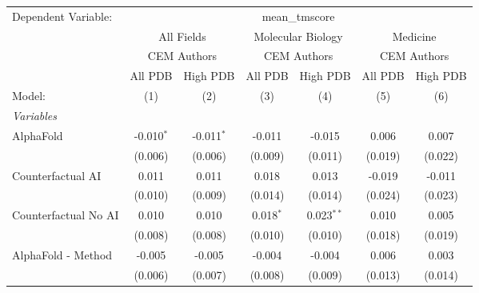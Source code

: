 \begingroup
\centering
\begin{tabular}{lcccccc}
   \tabularnewline \midrule \midrule
   Dependent Variable: & \multicolumn{6}{c}{mean\_tmscore}\\
 & \multicolumn{2}{c}{All Fields} & \multicolumn{2}{c}{Molecular Biology} & \multicolumn{2}{c}{Medicine} \\
\cmidrule(lr){2-3} \cmidrule(lr){4-5} \cmidrule(lr){6-7}
 & \multicolumn{2}{c}{CEM Authors} & \multicolumn{2}{c}{CEM Authors} & \multicolumn{2}{c}{CEM Authors} \\
\cmidrule(lr){2-3} \cmidrule(lr){4-5} \cmidrule(lr){6-7}
 & \multicolumn{1}{c}{All PDB} & \multicolumn{1}{c}{High PDB} & \multicolumn{1}{c}{All PDB} & \multicolumn{1}{c}{High PDB} & \multicolumn{1}{c}{All PDB} & \multicolumn{1}{c}{High PDB} \\
\cmidrule(lr){2-2} \cmidrule(lr){3-3} \cmidrule(lr){4-4} \cmidrule(lr){5-5} \cmidrule(lr){6-6} \cmidrule(lr){7-7}
   Model:                                                     & (1)            & (2)            & (3)           & (4)          & (5)     & (6)\\  
   \midrule
   \emph{Variables}\\
   AlphaFold                                                  & -0.010$^{*}$   & -0.011$^{*}$   & -0.011        & -0.015       & 0.006   & 0.007\\   
                                                              & (0.006)        & (0.006)        & (0.009)       & (0.011)      & (0.019) & (0.022)\\   
   Counterfactual AI                                          & 0.011          & 0.011          & 0.018         & 0.013        & -0.019  & -0.011\\   
                                                              & (0.010)        & (0.009)        & (0.014)       & (0.014)      & (0.024) & (0.023)\\   
   Counterfactual No AI                                       & 0.010          & 0.010          & 0.018$^{*}$   & 0.023$^{**}$ & 0.010   & 0.005\\   
                                                              & (0.008)        & (0.008)        & (0.010)       & (0.010)      & (0.018) & (0.019)\\   
   AlphaFold - Method                                         & -0.005         & -0.005         & -0.004        & -0.004       & 0.006   & 0.003\\   
                                                              & (0.006)        & (0.007)        & (0.008)       & (0.009)      & (0.013) & (0.014)\\   

\end{tabular}
